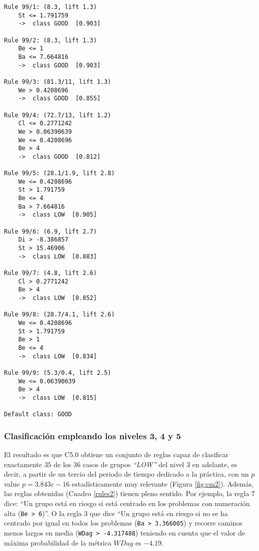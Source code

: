 \begin{tcolorbox}[title=Reglas de clasificación para identificar grupos de tipo \emph{``LOW''}.]
  \makeatletter
  \makeatother
  
 \label{rules3}  
  
\begin{multicols}{2}
    \begin{verbatim}
Rule 99/1: (8.3, lift 1.3)
	St <= 1.791759
	->  class GOOD  [0.903]

Rule 99/2: (8.3, lift 1.3)
	Be <= 1
	Ba <= 7.664816
	->  class GOOD  [0.903]

Rule 99/3: (81.3/11, lift 1.3)
	We > 0.4208696
	->  class GOOD  [0.855]

Rule 99/4: (72.7/13, lift 1.2)
	Cl <= 0.2771242
	We > 0.06390639
	We <= 0.4208696
	Be > 4
	->  class GOOD  [0.812]

Rule 99/5: (28.1/1.9, lift 2.8)
	We <= 0.4208696
	St > 1.791759
	Be <= 4
	Ba > 7.664816
	->  class LOW  [0.905]

Rule 99/6: (6.9, lift 2.7)
	Di > -8.386857
	St > 15.46906
	->  class LOW  [0.883]

Rule 99/7: (4.8, lift 2.6)
	Cl > 0.2771242
	Be > 4
	->  class LOW  [0.852]

Rule 99/8: (28.7/4.1, lift 2.6)
	We <= 0.4208696
	St > 1.791759
	Be > 1
	Be <= 4
	->  class LOW  [0.834]

Rule 99/9: (5.3/0.4, lift 2.5)
	We <= 0.06390639
	Be > 4
	->  class LOW  [0.815]

Default class: GOOD
    \end{verbatim}
  \end{multicols}
\end{tcolorbox}

\subsubsection{Clasificación empleando los niveles 3, 4 y 5}

El resultado es que C5.0 obtiene un conjunto de reglas capaz de clasificar exactamente $35$ de los $36$ casos de grupos \emph{``LOW''} del nivel $3$ en adelante, es decir, a partir de un tercio del periodo de tiempo dedicado a la práctica, con un $p$ value $p = 3.843e-16$ estadísticamente muy relevante (Figura \ref{fig:cm2}). Además, las reglas obtenidas (Cuadro \ref{rules2}) tienen pleno sentido. Por ejemplo, la regla $7$ dice: ``Un grupo está en riesgo si está centrado en los problemas con numeración alta (\texttt{Be > 6})''. O la regla $3$ que dice ``Un grupo está en riesgo si no se ha centrado por igual en todos los problemas (\texttt{Ba > 3.366005}) y recorre caminos menos largos en media (\texttt{WDag > -4.317488}) teniendo en cuenta que el valor de máxima probabilidad de la métrica $WDag$ es $-4.19$.

